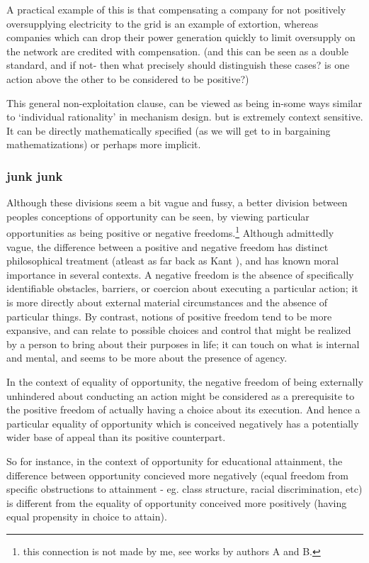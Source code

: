 A practical example of this is that compensating a company for not positively oversupplying electricity to the grid is an example of extortion, whereas companies which can drop their power generation quickly to limit oversupply on the network are credited with compensation. (and this can be seen as a double standard, and if not- then what precisely should distinguish these cases? is one action above the other to be considered to be positive?)

This general non-exploitation clause, can be viewed as being in-some ways similar to `individual rationality' in mechanism design. but is extremely context sensitive.
It can be directly mathematically specified (as we will get to in bargaining mathematizations) or perhaps more implicit.




\subsubsection{junk junk}



Although these divisions seem a bit vague and fussy, a better division between peoples conceptions of opportunity can be seen, by viewing particular opportunities as being positive or negative freedoms.\footnote{this connection is not made by me, see works by authors A and B.}
Although admittedly vague, the difference between a positive and negative freedom has distinct philosophical treatment (atleast as far back as Kant \cite{}), and has known moral importance in several contexts.
A negative freedom is the absence of specifically identifiable obstacles, barriers, or coercion about executing a particular action; it is more directly about external material circumstances and the absence of particular things.
By contrast, notions of positive freedom tend to be more expansive, and can relate to possible choices and control that might be realized by a person to bring about their purposes in life; it can touch on what is internal and mental, and seems to be more about the presence of agency.

In the context of equality of opportunity, the negative freedom of being externally unhindered about conducting an action might be considered as a prerequisite to the positive freedom of actually having a choice about its execution.
And hence a particular equality of opportunity which is conceived negatively has a  potentially wider base of appeal than its positive counterpart.

So for instance, in the context of opportunity for educational attainment, the difference between opportunity concieved more negatively (equal freedom from specific obstructions to attainment - eg. class structure, racial discrimination, etc) is different from the equality of opportunity conceived more positively (having equal propensity in choice to attain).

